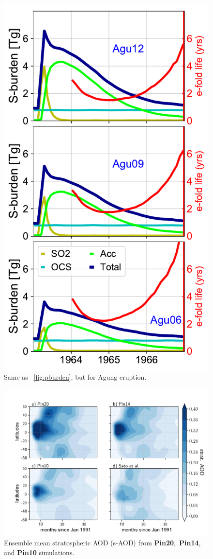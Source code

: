 \documentclass[acpd, hvmath, online]{copernicus_discussions}
\begin{document}
\newpage
\begin{figure}[ht!]
\includegraphics[width=.6\textwidth,height=.8\textheight,trim={0.1cm 0.1cm 0.1cm 0.1cm},clip]{Agu_burden.pdf}
\caption{Same as ~\ref{fig:pburden}, but for Agung eruption.} 
\label{fig:aburden}
\end{figure}





\newpage
\begin{figure}[ht!]
\includegraphics[width=.8\textwidth,height=.6\textheight,trim={0.1cm 0.1cm 0.1cm 0.1cm},clip]{Pin_mean_saod.pdf}
\caption{Ensemble mean stratospheric AOD (s-AOD) from \textbf{Pin20},~\textbf{Pin14}, and \textbf{Pin10} simulations.} 
\label{fig:paod}
\end{figure}
\end{document}
